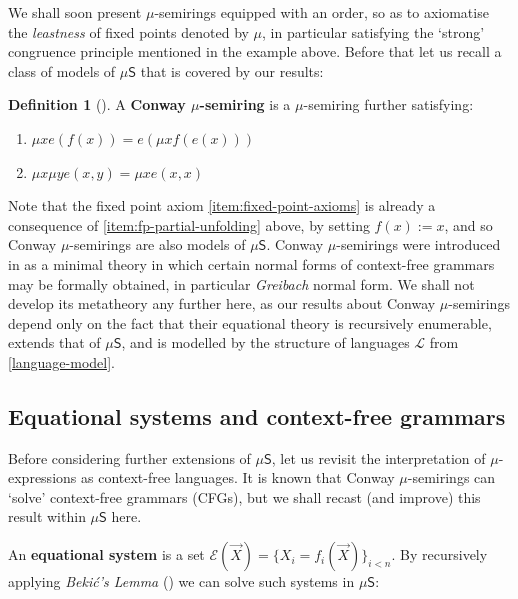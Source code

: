 \documentclass[a4paper,10pt]{amsart}
\newcommand{\defname}[1]{\textbf{{#1}}}
\newcommand{\df}{:=}
\theoremstyle{definition}
\newtheorem{definition}[theorem]{Definition}
\newcommand{\Lang}{\mathcal L}
\newcommand{\basicax}{\mu\mathsf{S}}
\begin{document}
We shall soon present $\mu$-semirings equipped with an order, so as to axiomatise the \emph{leastness} of fixed points denoted by $\mu$, in particular satisfying the `strong' congruence principle mentioned in the example above.
Before that let us recall a class of models of $\basicax$ that is covered by our results:

\begin{definition}
[\cite{EsikLeiss05}]
    A \defname{Conway $\mu$-semiring} is a $\mu$-semiring further satisfying:
    \begin{enumerate}
    \item\label{item:fp-partial-unfolding} $\mu x e(f(x)) = e(\mu x f(e(x)))$
        \item\label{item:fp-diagonal} $\mu x \mu y e(x,y) = \mu x e(x,x)$
    \end{enumerate}
\end{definition}

Note that the fixed point axiom \eqref{item:fixed-point-axioms} is already a consequence of \eqref{item:fp-partial-unfolding} above, by setting $f(x)\df x$, and so Conway $\mu$-semirings are also models of $\basicax$.
Conway $\mu$-semirings were introduced in \cite{EsikLeiss05} as a minimal theory in which certain normal forms of context-free grammars may be formally obtained, in particular \emph{Greibach} normal form. 
We shall not develop its metatheory any further here, as our results about Conway $\mu$-semirings depend only on the fact that their equational theory is recursively enumerable, extends that of $\basicax$, and is modelled by the structure of languages $\Lang$ from \cref{language-model}.

\subsection{Equational systems and context-free grammars}
Before considering further extensions of $\basicax$, let us revisit the interpretation of $\mu$-expressions as context-free languages.
It is known that Conway $\mu$-semirings can `solve' context-free grammars (CFGs), but we shall recast (and improve) this result within $\basicax$ here.


An \defname{equational system} is a set $\mathcal E (\vec X) = \{X_i = f_i(\vec X)\}_{i<n}$.
 By recursively applying \emph{Beki\'c's Lemma} (\cite{Bekic84}) we can solve such systems in $\basicax$:
\end{document}

